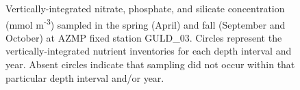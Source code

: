 \documentclass[12pt]{article}\usepackage[]{graphicx}\usepackage[]{color}
\begin{document}
\begin{figure}[htb]

{\centering {} 

}

\caption{Vertically-integrated nitrate, phosphate, and silicate concentration (mmol m\textsuperscript{-3}) sampled in the spring (April) and fall (September and October) at AZMP fixed station GULD\_03. Circles represent the vertically-integrated nutrient inventories for each depth interval and year. Absent circles indicate that sampling did not occur within that particular depth interval and/or year.}\label{fig:figure18}
\end{figure}
\clearpage
\end{document}
